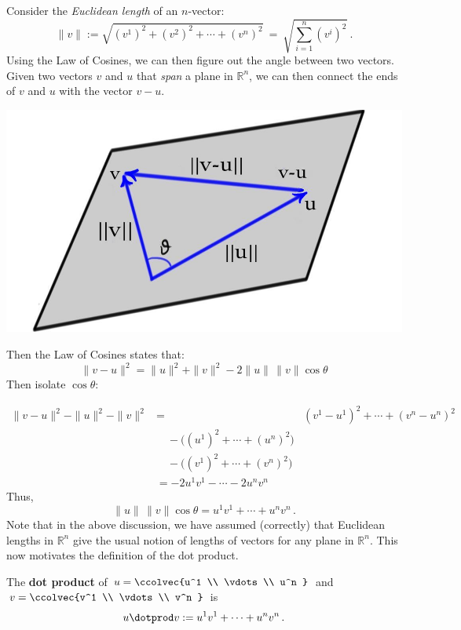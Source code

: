 Consider the {\itshape Euclidean length} of an $n$-vector: 
\[
\|v\| := \sqrt{(v^1)^2 + (v^2)^2+\cdots+(v^n)^2}\ =\ \sqrt{ \sum_{i=1}^n (v^i)^2 }\: .
\]
Using the Law of Cosines, we can then figure out the angle between two vectors.  Given two vectors $v$ and $u$ that {\itshape span} a plane in $\mathbb{R}^n$, we can then connect the ends of $v$ and $u$ with the vector $v-u$. 
 \begin{center}
\includegraphics[scale=.24]{triangleineq.jpg}
\end{center}
Then the Law of Cosines states that:
\[ 
\|v-u\|^2 = \|u\|^2 + \|v\|^2 - 2\|u\|\,  \|v\| \cos \theta 
\]
Then isolate $\cos \theta$:

\begin{align*}
\|v-u\|^2 - \|u\|^2 - \|v\|^2 &=& (v^1-u^1)^2 + \cdots + (v^n-u^n)^2 \\
& \quad - \big((u^1)^2 + \cdots + (u^n)^2\big) \\
& \quad - \big((v^1)^2 + \cdots + (v^n)^2\big) \\
& = -2 u^1v^1 - \cdots - 2u^nv^n
\end{align*}
Thus, 
\[
\|u\|\, \|v\| \cos \theta = u^1v^1 + \cdots + u^nv^n\, .
\]
Note that in the above discussion, we have assumed (correctly) that Euclidean lengths in ${\mathbb R}^n$
give the usual notion of lengths of vectors for any plane in ${\mathbb R}^n$. This now motivates the definition of the dot product.

\begin{definition} 
The {\bfseries dot product} of $u=\ccolvec{u^1 \\ \vdots \\ u^n }$ and $v=\ccolvec{v^1 \\ \vdots \\ v^n }$ is 
\[u\dotprod v := u^1v^1 + \cdots + u^nv^n\, .\]
\end{definition} 

